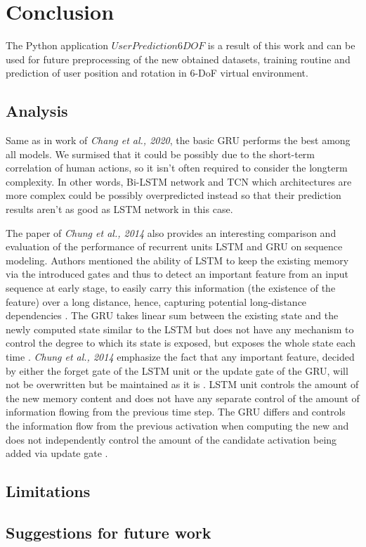 \chapter{Conclusion}
\label{sec:conclusion}
The Python application $UserPrediction6DOF$ is a result of this work and can be used for future preprocessing of the new obtained datasets, training routine and prediction of user position and rotation in 6-DoF virtual environment. 

\section{Analysis}
\label{sec:conclusion:analysis}
Same as in work of \textit{Chang et al., 2020}, the basic GRU performs the best among all models. We surmised that it could be possibly due to the short-term correlation of human actions, so it isn’t often required to consider the longterm complexity. In other words, Bi-LSTM network and TCN which architectures are more complex could be possibly overpredicted instead so that their prediction results aren’t as good as LSTM network in this case.

The paper of \textit{Chung et al., 2014}  also provides an interesting comparison and evaluation of the performance of recurrent units LSTM and GRU on sequence modeling. Authors mentioned the ability of LSTM to keep the existing memory via the introduced gates and thus to detect an important feature from an input sequence at early stage, to easily carry this information (the existence of the feature) over a long distance, hence, capturing potential long-distance dependencies \cite{empirical_evaluation}. The GRU takes linear sum between the existing state and the newly computed state similar to the LSTM but does not have any mechanism to control the degree to which its state is exposed, but exposes the whole state each time \cite{empirical_evaluation}. \textit{Chung et al., 2014} emphasize the fact that any important feature, decided by either the forget gate of the LSTM unit or the update gate of the GRU, will not be overwritten but be maintained as it is \cite{empirical_evaluation}. LSTM unit controls the amount of the new memory content and does not have any separate control of the amount of information flowing from the previous time step. The GRU differs and controls the information flow from the previous activation when computing the new and does not independently control the amount of the candidate activation being added via update gate \cite{empirical_evaluation}.

\section{Limitations}
\label{sec:conclusion:limitations}

\section{Suggestions for future work}
\label{sec:conclusion:future}

